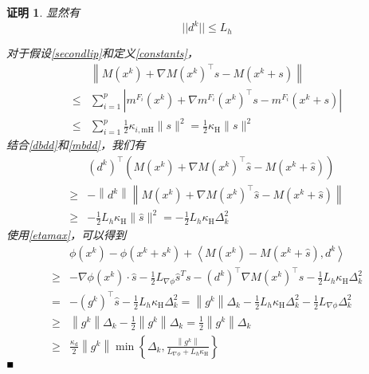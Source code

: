 \documentclass[macfonts]{njuthesis}
\newtheorem*{Proof}{证明}
\begin{document}
\begin{Proof}
显然有
\begin{equation}
\label{dbdd}
||d^k||\leq L_h
\end{equation}

对于假设\ref{secondlip}和定义\ref{constants}，
\begin{equation}
\label{mbdd}
\begin{aligned}
&\left\|M\left(x^{k}\right)+\nabla M\left(x^{k}\right)^{\top} s-M\left(x^{k}+s\right)\right\| \\
\leq & \sum_{i=1}^{p}\left|m^{F_{i}}\left(x^{k}\right)+\nabla m^{F_{i}}\left(x^{k}\right)^{\top} s-m^{F_{i}}\left(x^{k}+s\right)\right| \\
\leq & \sum_{i=1}^{p} \frac{1}{2} \kappa_{i, \mathrm{mH}}\|s\|^{2}=\frac{1}{2} \kappa_{\mathrm{H}}\|s\|^{2}
\end{aligned}
\end{equation}
结合\ref{dbdd}和\ref{mbdd}，我们有
$$
\begin{aligned}
&\left(d^{k}\right)^{\top}\left(M\left(x^{k}\right)+\nabla M\left(x^{k}\right)^{\top} \hat{s}-M\left(x^{k}+\hat{s}\right)\right) \\
\geq &-\left\|d^{k}\right\|\left\|M\left(x^{k}\right)+\nabla M\left(x^{k}\right)^{\top} \hat{s}-M\left(x^{k}+\hat{s}\right)\right\| \\
\geq &-\frac{1}{2} L_{h} \kappa_{\mathrm{H}}\|\hat{s}\|^{2}=-\frac{1}{2} L_{h} \kappa_{\mathrm{H}} \Delta_{k}^{2}
\end{aligned}
$$
使用\ref{etamax}，可以得到
$$
\begin{aligned}
&\phi(x^k)-\phi(x^k+s^k)+\left\langle M\left(x^{k}\right)-M\left(x^{k}+\hat{s}\right), d^{k}\right\rangle \\
\geq&-\nabla\phi(x^k)\cdot \hat{s}-\frac{1}{2}L_{\nabla \phi}\hat{s}^Ts-\left(d^{k}\right)^{\top} \nabla M\left(x^{k}\right)^{\top} \hat{s}-\frac{1}{2} L_{h} \kappa_{\mathrm{H}} \Delta_{k}^{2} \\
=&-\left(g^{k}\right)^{\top} \hat{s}-\frac{1}{2} L_{h} \kappa_{\mathrm{H}} \Delta_{k}^{2}=\left\|g^{k}\right\| \Delta_{k}-\frac{1}{2} L_{h} \kappa_{\mathrm{H}} \Delta_{k}^{2} -\frac{1}{2}L_{\nabla \phi}\Delta_k^2\\
\geq &\left\|g^{k}\right\| \Delta_{k}-\frac{1}{2}\left\|g^{k}\right\| \Delta_{k}=\frac{1}{2}\left\|g^{k}\right\| \Delta_{k} \\
\geq &\frac{\kappa_{\mathrm{d}}}{2}\left\|g^{k}\right\| \min \left\{\Delta_{k}, \frac{\left\|g^{k}\right\|}{L_{\nabla\phi}+L_{h} \kappa_{\mathrm{H}}}\right\}
\end{aligned}
$$
$\hfill\blacksquare$
\end{Proof}
\end{document}
